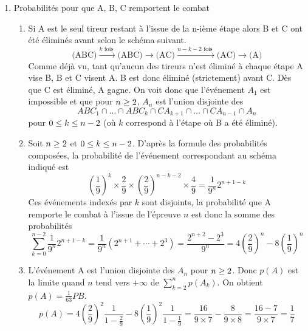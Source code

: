 \begin{enumerate}
\item Probabilités pour que A, B, C remportent le combat
\begin{enumerate}
\item Si A est le seul tireur restant à l'issue de  la n-ième étape alors B et C ont été éliminés avant selon le schéma suivant.
\begin{displaymath}
\text{(ABC)} \xrightarrow{ k \text{ fois }} \text{(ABC)} \rightarrow  \text{(AC)} \xrightarrow{ n-k-2 \text{ fois }}\text{(AC)}\rightarrow \text{(A)}  
\end{displaymath}
Comme déjà vu, tant qu'aucun des tireurs n'est éliminé à chaque étape A vise B,  B et C visent A. B est donc éliminé (strictement) avant C. Dès que C est éliminé, A gagne. On voit donc que l'événement $A_1$ est impossible et que  pour $n\geq 2$, $A_n$ est l'union disjointe des $$ABC_1 \cap \dots \cap ABC_k \cap CA_{k+1} \cap \dots \cap CA_{n-1} \cap A_n$$ pour $0 \leq k \leq n - 2$ (où $k$ correspond à l'étape où B a été éliminé). 
\item Soit $n\geq 2$ et  $0 \leq k \leq n - 2$. D'après la formule des probabilités composées, la probabilité de l'événement correspondant au schéma indiqué est
\begin{displaymath}
  \left( \frac{1}{9}\right)^{k}\times \frac{2}{9} \times \left( \frac{2}{9}\right)^{n-k-2}\times \frac{4}{9} = \frac{1}{9^n}2^{n+1-k}
\end{displaymath}
Ces événements indexés par $k$ sont disjoints, la probabilité que A remporte le combat à l'issue de l'épreuve $n$ est donc la somme des probabilités
\begin{displaymath}
  \sum_{k=0}^{n-2}\frac{1}{9^n}2^{n+1-k} = \frac{1}{9^n}\left(2^{n+1}+\cdots+2^3 \right) = \frac{2^{n+2} -2^{3}}{9^{n}}
  =4\left(\frac{2}{9} \right)^{n}-8\left(\frac{1}{9} \right)^{n} 
\end{displaymath}

\item L'événement A est l'union disjointe des $A_n$ pour $n\geq2$. Donc $p(A)$ est la limite quand $n$ tend vers $+\infty$ de  
$\sum_{k=2}^n p(A_k)$. On obtient $p(A)=\frac{1}{63}PB$.
\begin{displaymath}
  p(A) = 4\left(\frac{2}{9} \right)^{2}\frac{1}{1-\frac{2}{9}}- 8\left(\frac{1}{9} \right)^{2}\frac{1}{1-\frac{1}{9}}
  =\frac{16}{9\times 7} - \frac{8}{9\times 8}=\frac{16-7}{9\times 7}=\frac{1}{7}
\end{displaymath}



\end{enumerate}
\end{enumerate}
